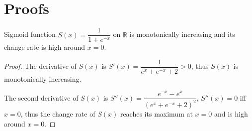 %
\chapter{Proofs}\label{sec:proof}
\begin{theorem}
    Sigmoid function $S(x)={\dfrac {1}{1+e^{-x}}}$ on $\mathbb{R}$ is monotonically increasing and its change rate is high around $x=0$.
    \begin{proof}
    The derivative of $S(x)$ is $S'(x)=\dfrac{1}{e^x+e^{-x}+2}>0$, thus $S(x)$ is monotonically increasing.
    
    The second derivative of $S(x)$ is $S''(x)=\dfrac{e^{-x}-e^x}{(e^x+e^{-x}+2)^2}$, $S''(x)=0$ iff $x=0$, thus the change rate of $S(x)$ reaches its maximum at $x=0$ and is high around $x=0$.
    \end{proof}
    
    
\end{theorem}


